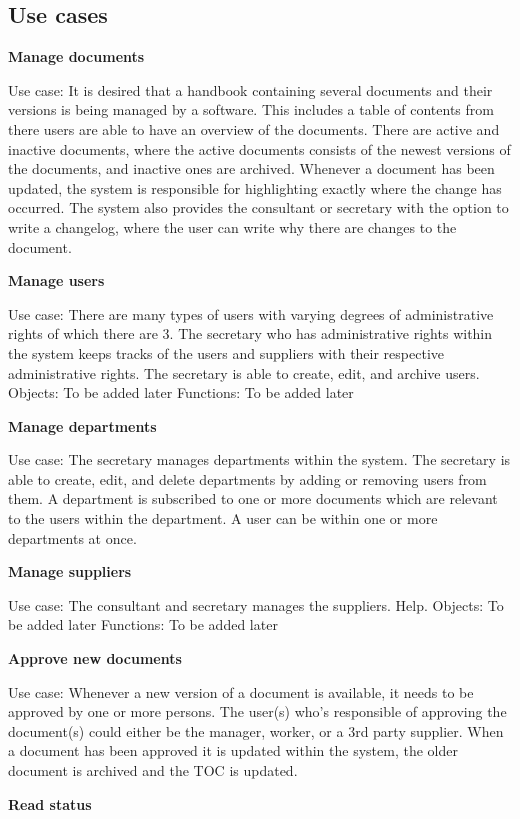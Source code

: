 \subsection{Use cases}

\textbf{Manage documents}

Use case: It is desired that a handbook containing several documents and their versions is being managed by a software. This includes a table of contents from there users are able to have an overview of the documents. There are active and inactive documents, where the active documents consists of the newest versions of the documents, and inactive ones are archived. Whenever a document has been updated, the system is responsible for highlighting exactly where the change has occurred. The system also provides the consultant or secretary with the option to write a changelog, where the user can write why there are changes to the document.

\textbf{Manage users}

Use case: There are many types of users with varying degrees of administrative rights of which there are 3. The secretary who has administrative rights within the system keeps tracks of the users and suppliers with their respective administrative rights. The secretary is able to create, edit, and archive users.
Objects: To be added later
Functions: To be added later

\textbf{Manage departments}

Use case: The secretary manages departments within the system. The secretary is able to create, edit, and delete departments by adding or removing users from them. A department is subscribed to one or more documents which are relevant to the users within the department. A user can be within one or more departments at once.

\textbf{Manage suppliers}

Use case: The consultant and secretary manages the suppliers. Help.
Objects: To be added later
Functions: To be added later

\textbf{Approve new documents}

Use case: Whenever a new version of a document is available, it needs to be approved by one or more persons. The user(s) who’s responsible of approving the document(s) could either be the manager, worker, or a 3rd party supplier. When a document has been approved it is updated within the system, the older document is archived and the TOC is updated.

\textbf{Read status}

